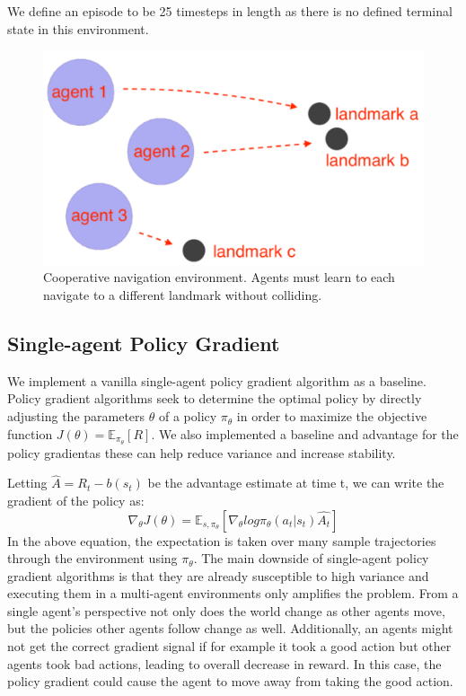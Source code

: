 \documentclass{article}
\begin{document}
We define an episode to be 25 timesteps in length as there is no defined terminal state in this environment.

\begin{figure}
\begin{center}
\includegraphics[scale=0.5]{env-image}
\end{center}
\caption{Cooperative navigation environment. Agents must learn to each navigate to a different landmark without colliding.}
\end{figure}

\subsection{Single-agent Policy Gradient}
We implement a vanilla single-agent policy gradient algorithm as a baseline. Policy gradient algorithms seek to determine the optimal policy by directly adjusting the parameters $\theta$ of a policy $\pi_\theta$ in order to maximize the objective function $J(\theta) = \mathbb{E}_{\pi_\theta}[R]$. We also implemented a baseline and advantage for the policy gradientas these can help reduce variance and increase stability.

Letting $\hat{A} = R_t - b(s_t)$ be the advantage estimate at time t, we can write the gradient of the policy as:
$$\nabla_\theta J(\theta) = \mathbb{E}_{s,\pi_\theta}[\nabla_\theta log \pi_\theta(a_t|s_t)\hat{A_t}]$$
In the above equation, the expectation is taken over many sample trajectories through the environment using $\pi_\theta$. The main downside of single-agent policy gradient algorithms is that they are already susceptible to  high variance and executing them in a multi-agent environments only amplifies the problem. From a single agent's perspective not only does the world change as other agents move, but the policies other agents follow change as well. Additionally, an agents might not get the correct gradient signal if for example it took a good action but other agents took bad actions, leading to overall decrease in reward. In this case, the policy gradient could cause the agent to move away from taking the good action.
\end{document}
